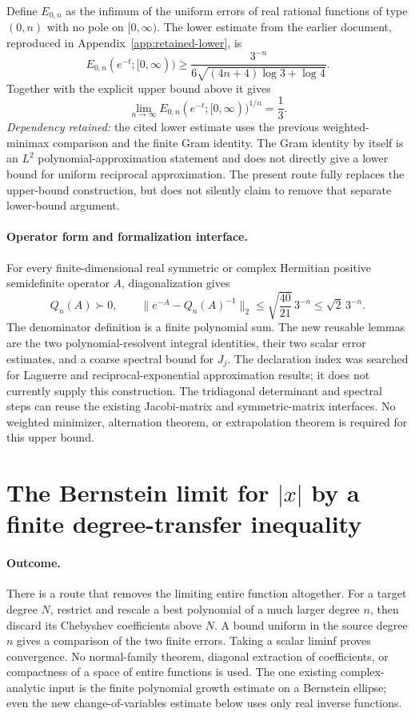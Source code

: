 \documentclass[11pt,a4paper]{article}
\theoremstyle{definition}
\begin{document}
Define $E_{0,n}$ as the infimum of the uniform errors of real rational
functions of type $(0,n)$ with no pole on $[0,\infty)$. The lower estimate
from the earlier document, reproduced in Appendix~\ref{app:retained-lower}, is
\[
 E_{0,n}(e^{-t};[0,\infty))\ge
 \frac{3^{-n}}{6\sqrt{(4n+4)\log3+\log4}}.
\]
Together with the explicit upper bound above it gives
\[
 \lim_{n\to\infty}E_{0,n}(e^{-t};[0,\infty))^{1/n}=\frac13.
\]
\emph{Dependency retained:} the cited lower estimate uses the previous
weighted-minimax comparison and the finite Gram identity. The Gram identity
by itself is an $L^2$ polynomial-approximation statement and does not directly
give a lower bound for uniform reciprocal approximation. The present route
fully replaces the upper-bound construction, but does not silently claim to
remove that separate lower-bound argument.

\paragraph{Operator form and formalization interface.}
For every finite-dimensional real symmetric or complex Hermitian positive
semidefinite operator $A$, diagonalization gives
\[
 Q_n(A)\succ0,\qquad
 \|e^{-A}-Q_n(A)^{-1}\|_2
 \le\sqrt{\frac{40}{21}}\,3^{-n}\le\sqrt2\,3^{-n}.
\]
The denominator definition is a finite polynomial sum. The new reusable
lemmas are the two polynomial-resolvent integral identities, their two
scalar error estimates, and a coarse spectral bound for $J_j$.
The declaration index was searched for Laguerre and reciprocal-exponential
approximation results; it does not currently supply this construction.
The tridiagonal determinant and spectral steps can reuse the existing
Jacobi-matrix and symmetric-matrix interfaces. No weighted minimizer,
alternation theorem, or extrapolation theorem is required for this upper
bound.


\section{The Bernstein limit for \texorpdfstring{$|x|$}{abs(x)} by a finite degree-transfer inequality}
\label{sec:finite-bernstein}

\paragraph{Outcome.}
There is a route that removes the limiting entire function altogether.
For a target degree $N$, restrict and rescale a best polynomial of a much
larger degree $n$, then discard its Chebyshev coefficients above $N$.
A bound uniform in the source degree $n$ gives a comparison of the two
finite errors. Taking a scalar liminf proves convergence. No normal-family
theorem, diagonal extraction of coefficients, or compactness of a space
of entire functions is used. The one existing complex-analytic input is
the finite polynomial growth estimate on a Bernstein ellipse; even the
new change-of-variables estimate below uses only real inverse functions.
\end{document}
